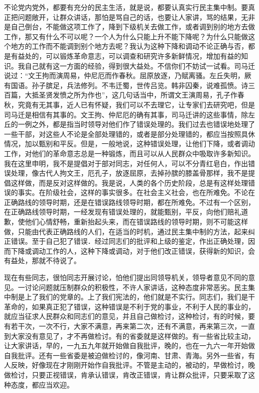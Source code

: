 不论党内党外，都要有充分的民主生活，就是说，都要认真实行民主集中制。要真正把问题敞开，让群众讲话，那怕是骂自己的话，也要让人家讲，骂的结果，无非是自己倒台，不能做这项工作了，降到下级机关去做工作，或者调到别的地方去做工作，那又有什么不可以呢？一个人为什么只能上升不能下降呢？为什么只能做这个地方的工作而不能调到别个地方去呢？我认为这种下降和调动不论正确与否，都是有益处的，可以锻炼革命意志，可以调查和研究许多新鲜情况，增加有益的知识。我自己就有这一方面的经验，得到很大益处。不信你们不妨试一试看。司马迁说过：“文王拘而演周易，仲尼厄而作春秋。屈原放逐，乃赋离骚。左丘失明，厥有国语。孙子膑足，兵法修列。不韦迁蜀，世传吕览。韩非囚秦，说难孤愤。诗三百篇，大抵圣贤发愤之所为作也”，这几句话当中，所谓文王演周易，孔子作春秋，究竟有无其事，近人已有怀疑，我们可以不去理它，让专家们去研究吧，但是司马迁是相信有其事的。文王拘、仲尼厄的确有其事，司马迁讲的这些事情，除左丘的一例之外，都是指当时领导对他们作了错误处理的。我们过去也错误地处理了一些干部，对这些人不论是全部处理错的，或者是部分处理错的，都应当按照具休情况，加以甄别和平反。但是，一般地说，这种错误处理，让他们下降，或者调动工作，对他们的革命意志总是一种锻炼，而且可以从人民群众中吸取许多新知识。我在这里申明，我不是提倡对于部对同志，对任何人，可以不分青红皂白，作出错误处理，像古代人拘文王，厄孔子，放逐屈原，去掉孙膑的膝盖骨那样，我不是提倡这样做，而是反对这样做的。我是说，人类的各个历史阶段，总是有这样处理错误的事实。在阶级社会，这样的事实很多。在社会主义社会，也在所难免。不论在正确路线的领导时期，还是在错误路线领导时期，都在所难免。不过有一个区别，在正确路线领导时期，一经发现有错误处理的，就能甄别，平反，向他们赔礼道歉，使他们心情舒畅，重新抬起头来，而在错误路线的领导时期，则不可能这样做，只能由代表正确路线的人们，在适当的时机，通过民主集中制的方法，起来纠正错误。至于自己犯了错误．经过同志们的批评和上级的鉴定，作出正确处理，因而下降或调动工作的人，这种下降或调动，对于他们改正错误，获得新的知识，会有益处，那就不待说了。

现在有些同志，很怕同志开展讨论，怕他们提出同领导机关，领导者意见不同的意见。一讨论问题就压制群众的积极性，不许人家讲话，这种态度非常恶劣。民主集中制是上了我们的党章的。上了我们宪法的，他们就是不实行。同志们，我们是干革命的，如果真正犯了错误，这种错误是不利于党的事业，不利于人民的事业的，就应当征求人民群众和同志们的意见，并且自己做检讨，这种检讨，有的时候，要有若干次，一次不行，大家不满意，再来第二次，还有不满意，再来第三次，一直到大家没有意见了，才不再做检讨。有的省委就是这样做的。有一些省比较主动，让大家讲话，早的，一九五九年就开始做自我批评，晚的，也在一九六一年开始做自我批评。还有一些省委是被迫做检讨的，像河南、甘肃、青海。另外一些省，有人反映，好像现在才刚刚开始作自我批评。不管是主动的，被动的，早做检讨，晚做检讨，只要正视错误，肯承认错误，肯改正错误，肯让群众批评，只要采取了这种态度，都应当欢迎。

